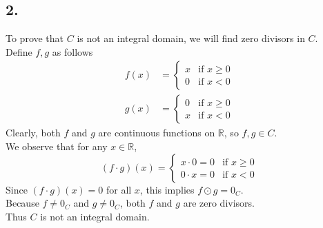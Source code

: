 \documentclass[11pt, a4paper]{article}
\begin{document}
\subsection*{2.}
To prove that $C$ is not an integral domain, we will find zero divisors in $C$.\\
Define $f, g$ as follows
\begin{align*}
    f(x) &= 
    \begin{cases} 
        x & \text{if } x \geq 0 \\ 
        0 & \text{if } x < 0
    \end{cases} \\
    g(x) &= 
    \begin{cases} 
        0 & \text{if } x \geq 0 \\ 
        x & \text{if } x < 0 
    \end{cases}
\end{align*}
Clearly, both $f$ and $g$ are continuous functions on $\mathbb{R}$, so $f, g \in C$. \\
We observe that for any $x \in \mathbb{R}$,
\[
(f \cdot g)(x) =
\begin{cases} 
    x \cdot 0 = 0 & \text{if } x \geq 0 \\ 
    0 \cdot x = 0 & \text{if } x < 0
\end{cases}
\]
Since $(f \cdot g)(x) = 0$ for all $x$, this implies $f \odot g = 0_C$. \\
Because $f \neq 0_C$ and $g \neq 0_C$, both $f$ and $g$ are zero divisors.\\
Thus $C$ is not an integral domain.
\end{document}
